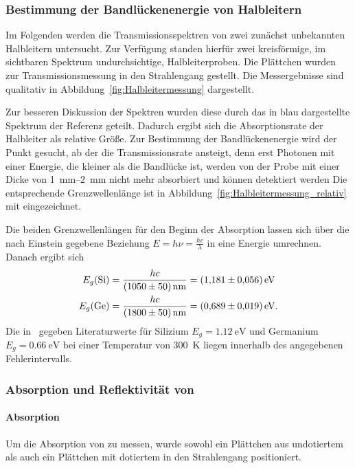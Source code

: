 \documentclass[a4paper,twoside,final]{article}
\begin{document}


\FloatBarrier
\subsubsection{Bestimmung der Bandlückenenergie von Halbleitern}

Im Folgenden werden die Transmissionsspektren von zwei zunächst unbekannten Halbleitern untersucht. Zur Verfügung standen hierfür zwei kreisförmige, im sichtbaren Spektrum undurchsichtige, Halbleiterproben. Die Plättchen wurden zur Transmissionsmessung in den Strahlengang gestellt. Die Messergebnisse sind qualitativ in Abbildung~\ref{fig:Halbleitermessung} dargestellt.



Zur besseren Diskussion der Spektren wurden diese durch das in blau dargestellte Spektrum der Referenz geteilt. Dadurch ergibt sich die Absorptionsrate der Halbleiter als relative Größe. Zur Bestimmung der Bandlückenenergie wird der Punkt gesucht, ab der die Transmissionsrate ansteigt, denn erst Photonen mit einer Energie, die kleiner als die Bandlücke ist, werden von der Probe mit einer Dicke von \SIrange{1}{2}{\milli\metre} nicht mehr absorbiert und können detektiert werden Die entsprechende Grenzwellenlänge ist in Abbildung~\ref{fig:Halbleitermessung_relativ} mit eingezeichnet.



Die beiden Grenzwellenlängen für den Beginn der Absorption lassen sich über die nach Einstein gegebene Beziehung $E = h \nu = \frac{h c}{\lambda}$ in eine Energie umrechnen. Danach ergibt sich
\begin{align}
  E_g(\ce{Si}) &= \frac{h c}{\SI{1050\pm50}{\nano\metre}} = \SI{1.181\pm0.056}{\electronvolt}\\
  E_g(\ce{Ge}) &= \frac{h c}{\SI{1800\pm50}{\nano\metre}} = \SI{0.689\pm0.019}{\electronvolt}.
\end{align}
Die in~\cite{Hunklinger} gegeben Literaturwerte für Silizium $E_g = \SI{1.12}{\electronvolt}$ und Germanium $E_g = \SI{0.66}{\electronvolt}$ bei einer Temperatur von \SI{300}{\kelvin} liegen innerhalb des angegebenen Fehlerintervalls.

\subsubsection{Absorption und Reflektivität von }
\paragraph{Absorption}
Um die Absorption von  zu messen, wurde sowohl ein Plättchen aus undotiertem als auch ein Plättchen mit dotiertem  in den Strahlengang positioniert.
\end{document}

